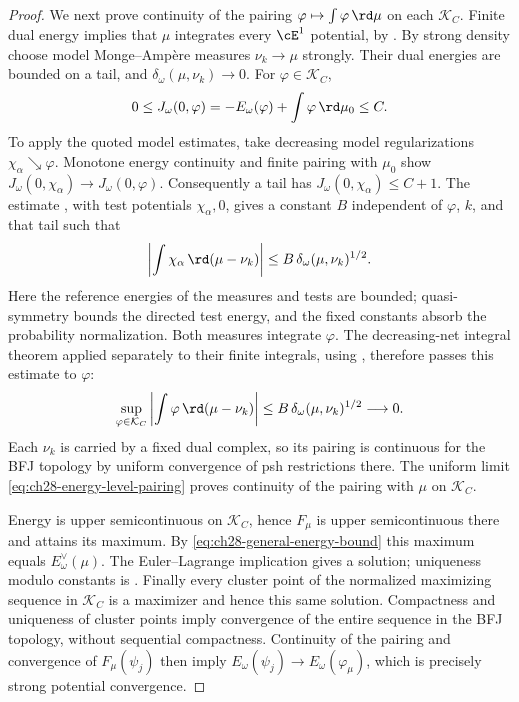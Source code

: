 \begin{proof}
We next prove continuity of the pairing
$\varphi\mapsto\int\varphi\,\rd\mu$ on each $\mathcal K_C$.
Finite dual energy implies that $\mu$ integrates every $\cE^1$ potential,
by .  By strong density choose model
Monge--Amp\`ere measures $\nu_k\to\mu$ strongly.  Their dual energies
are bounded on a tail, and $\delta_\omega(\mu,\nu_k)\to0$.
For $\varphi\in\mathcal K_C$,
\[
 0\leq J_\omega(0,\varphi)
       =-E_\omega(\varphi)+\int\varphi\,\rd\mu_0\leq C.
\]
To apply the quoted model estimates, take decreasing model
regularizations $\chi_\alpha\searrow\varphi$.  Monotone energy
continuity and finite pairing with $\mu_0$ show
$J_\omega(0,\chi_\alpha)\to J_\omega(0,\varphi)$.
Consequently a tail has $J_\omega(0,\chi_\alpha)\leq C+1$.
The estimate
\cite[Theorem~2.23(iv), equation~(2.25)]{BJ25FiniteEnergy},
with test potentials $\chi_\alpha,0$, gives a constant $B$ independent
of $\varphi$, $k$, and that tail such that
\[
 \left|\int\chi_\alpha\,\rd(\mu-\nu_k)\right|
       \leq B\,\delta_\omega(\mu,\nu_k)^{1/2}.
\]
Here the reference energies of the measures and tests are bounded;
quasi-symmetry bounds the directed test energy, and the fixed constants
absorb the probability normalization.  Both measures integrate
$\varphi$.  The decreasing-net integral theorem applied separately to
their finite integrals, using ,
therefore passes this estimate to $\varphi$:
\begin{equation}
\label{eq:ch28-energy-level-pairing}
 \sup_{\varphi\in\mathcal K_C}
 \left|\int\varphi\,\rd(\mu-\nu_k)\right|
       \leq B\,\delta_\omega(\mu,\nu_k)^{1/2}\longrightarrow0.
\end{equation}
Each $\nu_k$ is carried by a fixed dual complex, so its pairing is
continuous for the BFJ topology by uniform convergence of psh
restrictions there.  The uniform limit
\eqref{eq:ch28-energy-level-pairing} proves continuity of the pairing
with $\mu$ on $\mathcal K_C$.

Energy is upper semicontinuous on $\mathcal K_C$, hence $F_\mu$ is
upper semicontinuous there and attains its maximum.  By
\eqref{eq:ch28-general-energy-bound} this maximum equals
$E_\omega^\vee(\mu)$.  The Euler--Lagrange implication
 gives a solution; uniqueness
modulo constants is \cite[Proposition~8.2]{BFJ15}.
Finally every cluster point of the normalized maximizing sequence in
$\mathcal K_C$ is a maximizer and hence this same solution.  Compactness
and uniqueness of cluster points imply convergence of the entire
sequence in the BFJ topology, without sequential compactness.
Continuity of the pairing and convergence of $F_\mu(\psi_j)$ then imply
$E_\omega(\psi_j)\to E_\omega(\varphi_\mu)$, which is precisely strong
potential convergence.
\end{proof}

